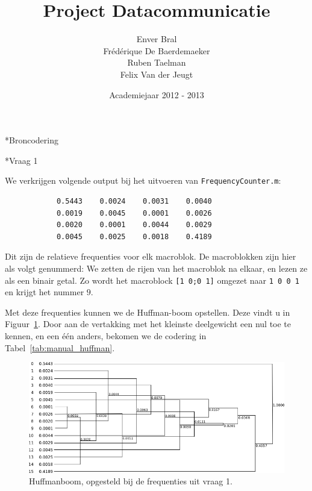 \documentclass[]{article}
\title{Project Datacommunicatie}
\author{Enver Bral \\
        Fr\'ed\'erique De Baerdemaeker \\
        Ruben Taelman \\
        Felix Van der Jeugt}
\date{Academiejaar 2012 - 2013}
\begin{document}
\maketitle
\begin{section}*{Broncodering}

    \begin{subsection}*{Vraag 1}

        We verkrijgen volgende output bij het uitvoeren van
        \texttt{FrequencyCounter.m}:

        \begin{lstlisting}
            0.5443    0.0024    0.0031    0.0040
            0.0019    0.0045    0.0001    0.0026
            0.0020    0.0001    0.0044    0.0029
            0.0045    0.0025    0.0018    0.4189
        \end{lstlisting}

        Dit zijn de relatieve frequenties voor elk macroblok. De
        macroblokken zijn hier als volgt genummerd: We zetten de rijen
        van het macroblok na elkaar, en lezen ze als een binair getal.  Zo
        wordt het macroblock \texttt{[1 0;0 1]} omgezet naar
        \texttt{1 0 0 1} en krijgt het nummer $9$.

        Met deze frequenties kunnen we de Huffman-boom opstellen. Deze
        vindt u in Figuur~\ref{fig:manual_huffman}. Door aan de
        vertakking met het kleinste deelgewicht een nul toe te kennen,
        en een \'e\'en anders, bekomen we de codering in
        Tabel~\ref{tab:manual_huffman}.

        \begin{figure}
            \centering
            \includegraphics[width=\textwidth]{manual_huffman.png}
            \caption{Huffmanboom, opgesteld bij de frequenties uit
            \label{fig:manual_huffman}
            vraag 1.}
        \end{figure}


\end{subsection}
\end{section}
\end{document}
